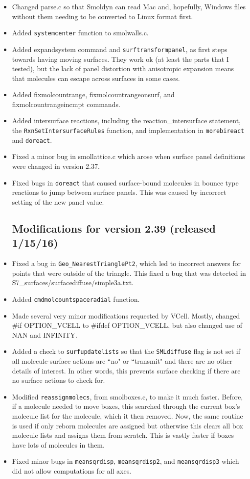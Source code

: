 \documentclass {scrbook}
\newcommand {\ttt} {\texttt}
\begin{document}
\begin{itemize}
\item Changed parse.c so that Smoldyn can read Mac and, hopefully, Windows files without them needing to be converted to Linux format first.
\item Added \ttt{systemcenter} function to smolwalls.c.
\item Added expandsystem command and \ttt{surftransformpanel}, as first steps towards having moving surfaces. They work ok (at least the parts that I tested), but the lack of panel distortion with anisotropic expansion means that molecules can escape across surfaces in some cases.
\item Added fixmolcountrange, fixmolcountrangeonsurf, and fixmolcountrangeincmpt commands.
\item Added intersurface reactions, including the reaction\_intersurface statement, the \ttt{RxnSetIntersurfaceRules} function, and implementation in \ttt{morebireact} and \ttt{doreact}.
\item Fixed a minor bug in smollattice.c which arose when surface panel definitions were changed in version 2.37.
\item Fixed bugs in \ttt{doreact} that caused surface-bound molecules in bounce type reactions to jump between surface panels. This was caused by incorrect setting of the new panel value.

\subsection{Modifications for version 2.39 (released 1/15/16)}
\item Fixed a bug in \ttt{Geo\_NearestTrianglePt2}, which led to incorrect answers for points that were outside of the triangle. This fixed a bug that was detected in S7\_surfaces/surfacediffuse/simple3a.txt.
\item Added \ttt{cmdmolcountspaceradial} function.
\item Made several very minor modifications requested by VCell. Mostly, changed \#if OPTION\_VCELL to \#ifdef OPTION\_VCELL, but also changed use of NAN and INFINITY.
\item Added a check to \ttt{surfupdatelists} so that the \ttt{SMLdiffuse} flag is not set if all molecule-surface actions are ``no" or ``transmit" and there are no other details of interest. In other words, this prevents surface checking if there are no surface actions to check for.
\item Modified \ttt{reassignmolecs}, from smolboxes.c, to make it much faster. Before, if a molecule needed to move boxes, this searched through the current box's molecule list for the molecule, which it then removed. Now, the same routine is used if only reborn molecules are assigned but otherwise this clears all box molecule lists and assigns them from scratch. This is vastly faster if boxes have lots of molecules in them.
\item Fixed minor bugs in \ttt{meansqrdisp}, \ttt{meansqrdisp2}, and \ttt{meansqrdisp3} which did not allow computations for all axes.


\end{itemize}
\end{document}

